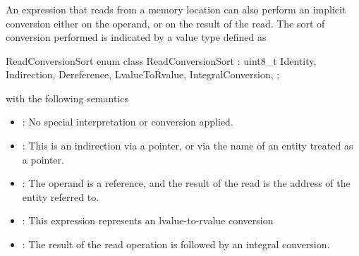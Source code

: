 

\subsubsection{}
An expression that reads from a memory location can also perform an implicit conversion either on the operand,
or on the result of the read.  The sort of conversion performed is indicated by a value type  defined as
\begin{typedef}{ReadConversionSort}{}
	enum class ReadConversionSort : uint8_t {
		Identity,
		Indirection,
		Dereference,
		LvalueToRvalue,
		IntegralConversion,
	};
\end{typedef}
with the following semantics
\begin{itemize}
	\item {}: No special interpretation or conversion applied.
	\item {}: This is an indirection via a pointer, or via the name of an entity treated as a pointer.
	\item {}: The operand is a reference, and the result of the read is the address of the entity referred to.
	\item {}: This expression represents an lvalue-to-rvalue conversion
	\item {}: The result of the read operation is followed by an integral conversion.
\end{itemize}


\subsection{}
\label{sec:ifc:ExprSort:Monad}

